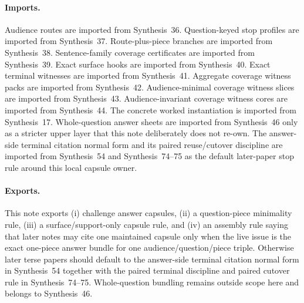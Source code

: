 \documentclass[11pt]{article}
\begin{document}
\paragraph{Imports.}
Audience routes are imported from Synthesis~36.\cite{series:challengeroutes}
Question-keyed stop profiles are imported from Synthesis~37.\cite{series:challengestops}
Route-plus-piece branches are imported from Synthesis~38.\cite{series:challengebranches}
Sentence-family coverage certificates are imported from Synthesis~39.\cite{series:challengecoverage}
Exact surface hooks are imported from Synthesis~40.\cite{series:challengesurfacehooks}
Exact terminal witnesses are imported from Synthesis~41.\cite{series:challengeterminalwitnesses}
Aggregate coverage witness packs are imported from Synthesis~42.\cite{series:challengecoveragewitnesspacks}
Audience-minimal coverage witness slices are imported from Synthesis~43.\cite{series:challengecoveragewitnessslices}
Audience-invariant coverage witness cores are imported from Synthesis~44.\cite{series:challengecoveragewitnesscores}
The concrete worked instantiation is imported from Synthesis~17.\cite{series:workedexample}
Whole-question answer sheets are imported from Synthesis~46 only as a stricter upper layer that this note deliberately does not re-own.\cite{series:challengeanswersheets}
The answer-side terminal citation normal form and its paired reuse/cutover discipline are imported from Synthesis~54 and Synthesis~74--75 as the default later-paper stop rule around this local capsule owner.\cite{series:challengeanswerreviewmenus,series:pairedterminalcitationdiscipline,series:pairedterminalcutoverrules}

\paragraph{Exports.}
This note exports (i) challenge answer capsules, (ii) a question-piece minimality rule, (iii) a surface/support-only capsule rule, and (iv) an assembly rule saying that later notes may cite one maintained capsule only when the live issue is the exact one-piece answer bundle for one audience/question/piece triple.
Otherwise later terse papers should default to the answer-side terminal citation normal form in Synthesis~54 together with the paired terminal discipline and paired cutover rule in Synthesis~74--75. Whole-question bundling remains outside scope here and belongs to Synthesis~46.\cite{series:challengeanswersheets,series:challengeanswerreviewmenus,series:pairedterminalcitationdiscipline,series:pairedterminalcutoverrules}
\end{document}
